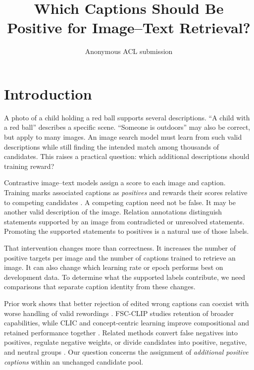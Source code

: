 \documentclass[11pt]{article}
\title{Which Captions Should Be Positive for Image--Text Retrieval?}
\author{Anonymous ACL submission}
\begin{document}


\maketitle
\begin{abstract}

\end{abstract}

\section{Introduction}
A photo of a child holding a red ball supports several descriptions. ``A child with a red ball'' describes a specific scene. ``Someone is outdoors'' may also be correct, but apply to many images. An image search model must learn from such valid descriptions while still finding the intended match among thousands of candidates. This raises a practical question: which additional descriptions should training reward?

Contrastive image--text models assign a score to each image and caption. Training marks associated captions as \emph{positives} and rewards their scores relative to competing candidates \citep{radford2021clip}. A competing caption need not be false. It may be another valid description of the image. Relation annotations distinguish statements supported by an image from contradicted or unresolved statements. Promoting the supported statements to positives is a natural use of those labels.

That intervention changes more than correctness. It increases the number of positive targets per image and the number of captions trained to retrieve an image. It can also change which learning rate or epoch performs best on development data. To determine what the supported labels contribute, we need comparisons that separate caption identity from these changes.

Prior work shows that better rejection of edited wrong captions can coexist with worse handling of valid rewordings \citep{kamath2024hardpositive}. FSC-CLIP studies retention of broader capabilities, while CLIC and concept-centric learning improve compositional and retained performance together \citep{oh2024fsc,peleg2025clic,pham2026nohard}. Related methods convert false negatives into positives, regulate negative weights, or divide candidates into positive, negative, and neutral groups \citep{byun2024mafa,jiang2023regulation,liu2023sat}. Our question concerns the assignment of \emph{additional positive captions} within an unchanged candidate pool.
\end{document}
